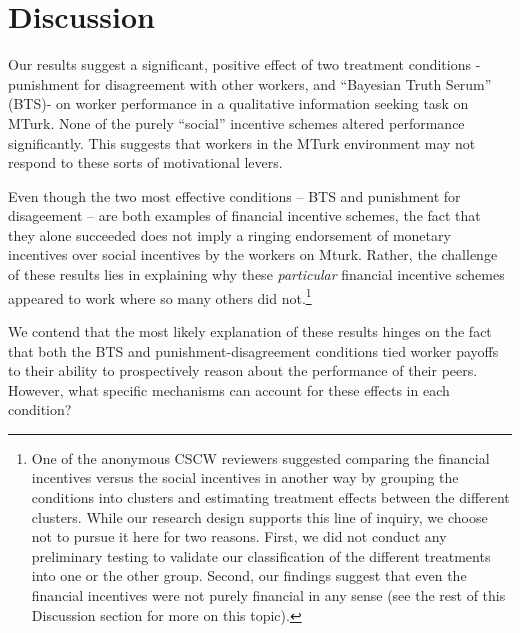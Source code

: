 \documentclass{chi2009}
\begin{document}
{\section{Discussion}

Our results suggest a significant, positive effect of two treatment
conditions - punishment for disagreement with other workers, and
``Bayesian Truth Serum'' (BTS)- on worker performance in a qualitative
information seeking task on MTurk. None of the purely ``social'' incentive
schemes altered performance significantly. This suggests that workers
in the MTurk environment may not respond to these sorts of
motivational levers.

Even though the two most effective conditions -- BTS
and punishment for disageement -- are both examples of financial incentive
schemes, the fact that they alone succeeded does not imply a ringing
endorsement of monetary incentives over social incentives by the
workers on Mturk. Rather, the challenge of these results lies in
explaining why these \emph{particular} financial incentive schemes
appeared to work where so many others did not.\footnote{One of the
  anonymous CSCW reviewers suggested comparing the financial
  incentives versus the social incentives in another way by grouping
  the conditions into clusters and estimating treatment effects
  between the different clusters. While our research design supports
  this line of inquiry, we choose not to pursue it here for two
  reasons. First, we did not conduct any preliminary testing to
  validate our classification of the different treatments into one or
  the other group. Second, our findings suggest that even the
  financial incentives were not purely financial in any sense (see the
  rest of this Discussion section for more on this topic).}

We contend that the most likely explanation of these results hinges on
the fact that both the BTS and punishment-disagreement conditions tied
worker payoffs to their ability to prospectively reason about the
performance of their peers. However, what specific mechanisms can
account for these effects in each condition?

}
\end{document}
